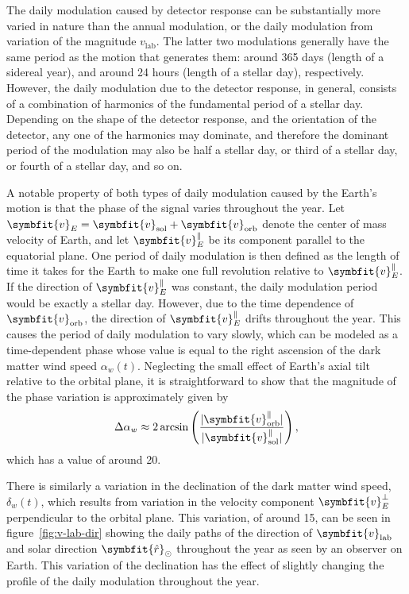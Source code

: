 \documentclass[b5paper, 10pt, twoside]{book}
\renewcommand{\vec}[1]{\symbfit{#1}}
\newcommand{\unitv}[1]{\symbfit{\hat{#1}}}
\begin{document}
The daily modulation caused by detector response can be substantially more varied in nature than the annual modulation, or the daily modulation from variation of the magnitude $v_\text{lab}$. The latter two modulations generally have the same period as the motion that generates them: around 365 days (length of a sidereal year), and around 24 hours (length of a stellar day), respectively. However, the daily modulation due to the detector response, in general, consists of a combination of harmonics of the fundamental period of a stellar day. Depending on the shape of the detector response, and the orientation of the detector, any one of the harmonics may dominate, and therefore the dominant period of the modulation may also be half a stellar day, or third of a stellar day, or fourth of a stellar day, and so on.

A notable property of both types of daily modulation caused by the Earth's motion is that the phase of the signal varies throughout the year. Let $\vec{v}_E=\vec{v}_\text{sol}+\vec{v}_\text{orb}$ denote the center of mass velocity of Earth, and let $\vec{v}_E^\parallel$ be its component parallel to the equatorial plane. One period of daily modulation is then defined as the length of time it takes for the Earth to make one full revolution relative to $\vec{v}_E^\parallel$. If the direction of $\vec{v}_E^\parallel$ was constant, the daily modulation period would be exactly a stellar day. However, due to the time dependence of $\vec{v}_\text{orb}$, the direction of $\vec{v}_E^\parallel$ drifts throughout the year. This causes the period of daily modulation to vary slowly, which can be modeled as a time-dependent phase whose value is equal to the right ascension of the dark matter wind speed $\alpha_w(t)$. Neglecting the small effect of Earth's axial tilt relative to the orbital plane, it is straightforward to show that the magnitude of the phase variation is approximately given by
\begin{equation}
\Delta\alpha_w\approx 2\arcsin\left(\frac{|\vec{v}_\text{orb}^\parallel|}{|\vec{v}_\text{sol}^\parallel|}\right),
\end{equation}
which has a value of around 20\degree.

There is similarly a variation in the declination of the dark matter wind speed, $\delta_w(t)$, which results from variation in the velocity component $\vec{v}_E^\perp$ perpendicular to the orbital plane. This variation, of around 15\degree{}, can be seen in figure~\ref{fig:v-lab-dir} showing the daily paths of the direction of $\vec{v}_\text{lab}$ and solar direction $\unitv{r}_\odot$ throughout the year as seen by an observer on Earth. This variation of the declination has the effect of slightly changing the profile of the daily modulation throughout the year.
\end{document}
